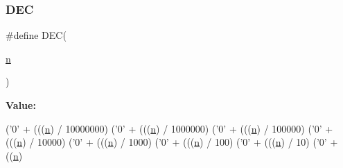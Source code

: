 \subsubsection{\texorpdfstring{D\+EC}{DEC}}
{\footnotesize\ttfamily \#define D\+EC(\begin{DoxyParamCaption}\item[{}]{\hyperlink{write__vtu__template_8cpp_a781a04ab095280f838ff3eb0e51312e0}{n} }\end{DoxyParamCaption})}

{\bfseries Value\+:}
\begin{DoxyCode}
(\textcolor{charliteral}{'0'} + (((\hyperlink{v_plot_field2_d_8m_a4c2d80ab32fc3a598413ae25e9f2bdce}{n}) / 10000000)%
  (\textcolor{charliteral}{'0'} + (((\hyperlink{v_plot_field2_d_8m_a4c2d80ab32fc3a598413ae25e9f2bdce}{n}) / 1000000)%
  (\textcolor{charliteral}{'0'} + (((\hyperlink{v_plot_field2_d_8m_a4c2d80ab32fc3a598413ae25e9f2bdce}{n}) / 100000)%
  (\textcolor{charliteral}{'0'} + (((\hyperlink{v_plot_field2_d_8m_a4c2d80ab32fc3a598413ae25e9f2bdce}{n}) / 10000)%
  (\textcolor{charliteral}{'0'} + (((\hyperlink{v_plot_field2_d_8m_a4c2d80ab32fc3a598413ae25e9f2bdce}{n}) / 1000)%
  (\textcolor{charliteral}{'0'} + (((\hyperlink{v_plot_field2_d_8m_a4c2d80ab32fc3a598413ae25e9f2bdce}{n}) / 100)%
  (\textcolor{charliteral}{'0'} + (((\hyperlink{v_plot_field2_d_8m_a4c2d80ab32fc3a598413ae25e9f2bdce}{n}) / 10)%
  (\textcolor{charliteral}{'0'} +  ((\hyperlink{v_plot_field2_d_8m_a4c2d80ab32fc3a598413ae25e9f2bdce}{n}) %
\end{DoxyCode}
\mbox{\label{3rd_party_2parmetis-4_80_83_2build_2_darwin-x86__64_2_c_make_files_23_88_82_2_compiler_id_c_2_c_make_c_compiler_id_8c_a46d5d95daa1bef867bd0179594310ed5}} 
